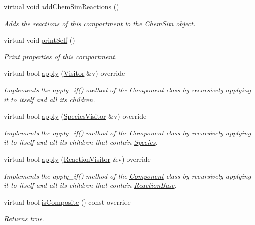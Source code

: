 \begin{DoxyCompactItemize}
virtual void \hyperlink{classCompartment_a6250da56cd928836b223b8fc90b38580}{add\+Chem\+Sim\+Reactions} ()
\begin{DoxyCompactList}\small\item\em Adds the reactions of this compartment to the \hyperlink{classChemSim}{Chem\+Sim} object. \end{DoxyCompactList}\item 
virtual void \hyperlink{classCompartment_a79ff3378bf4da9e9fe88669ef1a91ad0}{print\+Self} ()
\begin{DoxyCompactList}\small\item\em Print properties of this compartment. \end{DoxyCompactList}\item 
virtual bool \hyperlink{classComposite_a58123ab346f6621a187bebe456e383ea}{apply} (\hyperlink{classVisitor}{Visitor} \&v) override
\begin{DoxyCompactList}\small\item\em Implements the apply\+\_\+if() method of the \hyperlink{classComponent}{Component} class by recursively applying it to itself and all its children. \end{DoxyCompactList}\item 
virtual bool \hyperlink{classComposite_a18937a1f6f84a159e77ba83dd34b2e20}{apply} (\hyperlink{classSpeciesVisitor}{Species\+Visitor} \&v) override
\begin{DoxyCompactList}\small\item\em Implements the apply\+\_\+if() method of the \hyperlink{classComponent}{Component} class by recursively applying it to itself and all its children that contain \hyperlink{classSpecies}{Species}. \end{DoxyCompactList}\item 
virtual bool \hyperlink{classComposite_aa4a608ee92aaaa6e0d63278595707474}{apply} (\hyperlink{classReactionVisitor}{Reaction\+Visitor} \&v) override
\begin{DoxyCompactList}\small\item\em Implements the apply\+\_\+if() method of the \hyperlink{classComponent}{Component} class by recursively applying it to itself and all its children that contain \hyperlink{classReactionBase}{Reaction\+Base}. \end{DoxyCompactList}\item 
virtual bool \hyperlink{classComposite_ae2c806010c5c1d2d166ce01f2710c271}{is\+Composite} () const override
\begin{DoxyCompactList}\small\item\em Returns true. \end{DoxyCompactList}\item 

\end{DoxyCompactItemize}
